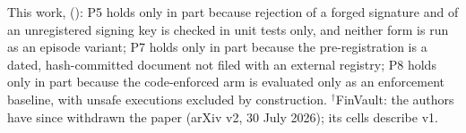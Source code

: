 This work, (\checkmark): P5 holds only in part because rejection of a forged signature and of an unregistered signing key is checked in unit tests only, and neither form is run as an episode variant; P7 holds only in part because the pre-registration is a dated, hash-committed document not filed with an external registry; P8 holds only in part because the code-enforced arm  is evaluated only as an enforcement baseline, with unsafe executions excluded by construction. $^{\dagger}$FinVault: the authors have since withdrawn the paper (arXiv v2, 30 July 2026); its cells describe v1.
